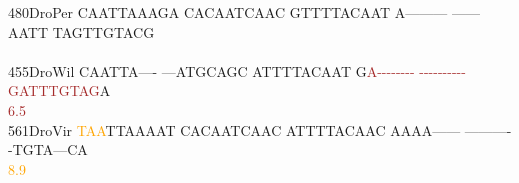 \documentclass[11pt,twoside,reqno,a4paper]{article}
\begin{document}
{480\hspace*{1\charwidth}DroPer	CAATTAAAGA	CACAATCAAC	GTTTTACAAT	A---------	------AATT	TAGTTGTACG	\\
\hspace*{4\charwidth}\hspace*{7\charwidth}\hspace*{1\charwidth}\hspace*{1\charwidth}\hspace*{1\charwidth}\hspace*{1\charwidth}\hspace*{1\charwidth}\hspace*{1\charwidth}\\
455\hspace*{1\charwidth}DroWil	CAATTA----	---ATGCAGC	ATTTTACAAT	G\textcolor{brown}{A}\textcolor{brown}{-}\textcolor{brown}{-}\textcolor{brown}{-}\textcolor{brown}{-}\textcolor{brown}{-}\textcolor{brown}{-}\textcolor{brown}{-}\textcolor{brown}{-}	\textcolor{brown}{-}\textcolor{brown}{-}\textcolor{brown}{-}\textcolor{brown}{-}\textcolor{brown}{-}\textcolor{brown}{-}\textcolor{brown}{-}\textcolor{brown}{-}\textcolor{brown}{-}\textcolor{brown}{-}	\textcolor{brown}{G}\textcolor{brown}{A}\textcolor{brown}{T}\textcolor{brown}{T}\textcolor{brown}{T}\textcolor{brown}{G}\textcolor{brown}{T}\textcolor{brown}{A}\textcolor{brown}{G}A	\\
\hspace*{4\charwidth}\hspace*{7\charwidth}\hspace*{1\charwidth}\hspace*{1\charwidth}\hspace*{1\charwidth}\hspace*{31\charwidth}\textcolor{brown}{6.5}\hspace*{1\charwidth}\hspace*{1\charwidth}\hspace*{1\charwidth}\\
561\hspace*{1\charwidth}DroVir	\textcolor{orange}{T}\textcolor{orange}{A}\textcolor{orange}{A}TTAAAAT	CACAATCAAC	ATTTTACAAC	AAAA------	----------	-TGTA---CA	\\
\hspace*{4\charwidth}\hspace*{7\charwidth}\hspace*{0\charwidth}\textcolor{orange}{8.9}\hspace*{1\charwidth}\hspace*{1\charwidth}\hspace*{1\charwidth}\hspace*{1\charwidth}\hspace*{1\charwidth}\hspace*{1\charwidth}\\
}
\end{document}
